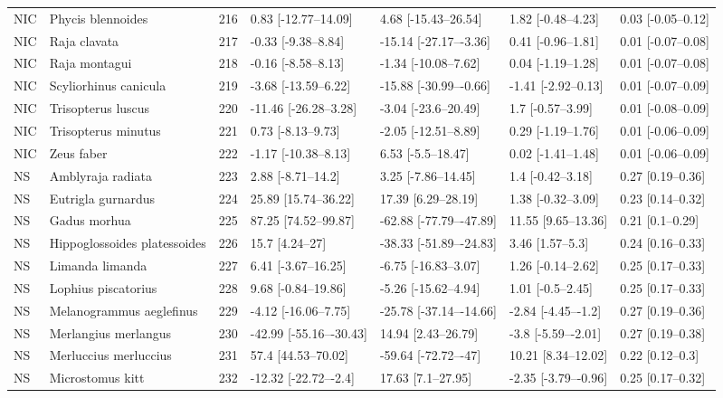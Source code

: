 \begin{longtable}[t]{lllllll}
\addlinespace
NIC & Phycis blennoides & 216 & 0.83 [-12.77–14.09] & 4.68 [-15.43–26.54] & 1.82 [-0.48–4.23] & 0.03 [-0.05–0.12]\\
NIC & Raja clavata & 217 & -0.33 [-9.38–8.84] & -15.14 [-27.17–-3.36] & 0.41 [-0.96–1.81] & 0.01 [-0.07–0.08]\\
NIC & Raja montagui & 218 & -0.16 [-8.58–8.13] & -1.34 [-10.08–7.62] & 0.04 [-1.19–1.28] & 0.01 [-0.07–0.08]\\
NIC & Scyliorhinus canicula & 219 & -3.68 [-13.59–6.22] & -15.88 [-30.99–-0.66] & -1.41 [-2.92–0.13] & 0.01 [-0.07–0.09]\\
NIC & Trisopterus luscus & 220 & -11.46 [-26.28–3.28] & -3.04 [-23.6–20.49] & 1.7 [-0.57–3.99] & 0.01 [-0.08–0.09]\\
\addlinespace
NIC & Trisopterus minutus & 221 & 0.73 [-8.13–9.73] & -2.05 [-12.51–8.89] & 0.29 [-1.19–1.76] & 0.01 [-0.06–0.09]\\
NIC & Zeus faber & 222 & -1.17 [-10.38–8.13] & 6.53 [-5.5–18.47] & 0.02 [-1.41–1.48] & 0.01 [-0.06–0.09]\\
NS & Amblyraja radiata & 223 & 2.88 [-8.71–14.2] & 3.25 [-7.86–14.45] & 1.4 [-0.42–3.18] & 0.27 [0.19–0.36]\\
NS & Eutrigla gurnardus & 224 & 25.89 [15.74–36.22] & 17.39 [6.29–28.19] & 1.38 [-0.32–3.09] & 0.23 [0.14–0.32]\\
NS & Gadus morhua & 225 & 87.25 [74.52–99.87] & -62.88 [-77.79–-47.89] & 11.55 [9.65–13.36] & 0.21 [0.1–0.29]\\
\addlinespace
NS & Hippoglossoides platessoides & 226 & 15.7 [4.24–27] & -38.33 [-51.89–-24.83] & 3.46 [1.57–5.3] & 0.24 [0.16–0.33]\\
NS & Limanda limanda & 227 & 6.41 [-3.67–16.25] & -6.75 [-16.83–3.07] & 1.26 [-0.14–2.62] & 0.25 [0.17–0.33]\\
NS & Lophius piscatorius & 228 & 9.68 [-0.84–19.86] & -5.26 [-15.62–4.94] & 1.01 [-0.5–2.45] & 0.25 [0.17–0.33]\\
NS & Melanogrammus aeglefinus & 229 & -4.12 [-16.06–7.75] & -25.78 [-37.14–-14.66] & -2.84 [-4.45–-1.2] & 0.27 [0.19–0.36]\\
NS & Merlangius merlangus & 230 & -42.99 [-55.16–-30.43] & 14.94 [2.43–26.79] & -3.8 [-5.59–-2.01] & 0.27 [0.19–0.38]\\
\addlinespace
NS & Merluccius merluccius & 231 & 57.4 [44.53–70.02] & -59.64 [-72.72–-47] & 10.21 [8.34–12.02] & 0.22 [0.12–0.3]\\
NS & Microstomus kitt & 232 & -12.32 [-22.72–-2.4] & 17.63 [7.1–27.95] & -2.35 [-3.79–-0.96] & 0.25 [0.17–0.32]\\

\end{longtable}
